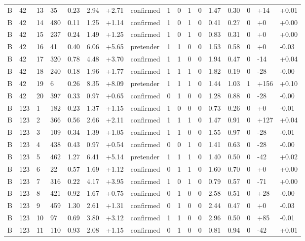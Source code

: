 \documentclass[11pt,a4paper]{article}
\begin{document}
{\begin{longtable}[]{@{}lllllllllllllllll@{}}
B & 42 & 13 & 35 & 0.23 & 2.94 & +2.71 & confirmed & 1 & 0 & 1 & 0 & 1.47 & 0.30 & 0 & +14 & +0.01 \\
B & 42 & 14 & 480 & 0.11 & 1.25 & +1.14 & confirmed & 1 & 0 & 1 & 0 & 0.41 & 0.27 & 0 & +0 & +0.00 \\
B & 42 & 15 & 237 & 0.24 & 1.49 & +1.25 & confirmed & 1 & 0 & 1 & 0 & 0.83 & 0.31 & 0 & +0 & +0.00 \\
B & 42 & 16 & 41 & 0.40 & 6.06 & +5.65 & pretender & 1 & 1 & 0 & 0 & 1.53 & 0.58 & 0 & +0 & -0.03 \\
B & 42 & 17 & 320 & 0.78 & 4.48 & +3.70 & confirmed & 1 & 1 & 0 & 0 & 1.94 & 0.47 & 0 & -14 & +0.04 \\
B & 42 & 18 & 240 & 0.18 & 1.96 & +1.77 & confirmed & 1 & 1 & 1 & 0 & 1.82 & 0.19 & 0 & -28 & -0.00 \\
B & 42 & 19 & 6 & 0.26 & 8.35 & +8.09 & pretender & 1 & 1 & 1 & 0 & 1.44 & 1.03 & 1 & +156 & +0.10 \\
B & 42 & 20 & 397 & 0.33 & 0.97 & +0.65 & confirmed & 0 & 1 & 0 & 0 & 1.28 & 0.88 & 0 & -28 & -0.00 \\
B & 123 & 1 & 182 & 0.23 & 1.37 & +1.15 & confirmed & 1 & 0 & 0 & 0 & 0.73 & 0.26 & 0 & +0 & -0.01 \\
B & 123 & 2 & 366 & 0.56 & 2.66 & +2.11 & confirmed & 1 & 1 & 1 & 0 & 1.47 & 0.91 & 0 & +127 & +0.04 \\
B & 123 & 3 & 109 & 0.34 & 1.39 & +1.05 & confirmed & 1 & 1 & 0 & 0 & 1.55 & 0.97 & 0 & -28 & -0.01 \\
B & 123 & 4 & 438 & 0.43 & 0.97 & +0.54 & confirmed & 0 & 0 & 1 & 0 & 1.41 & 0.63 & 0 & -28 & -0.00 \\
B & 123 & 5 & 462 & 1.27 & 6.41 & +5.14 & pretender & 1 & 1 & 1 & 0 & 1.40 & 0.50 & 0 & -42 & +0.02 \\
B & 123 & 6 & 22 & 0.57 & 1.69 & +1.12 & confirmed & 0 & 1 & 1 & 0 & 1.60 & 0.70 & 0 & +0 & +0.00 \\
B & 123 & 7 & 316 & 0.22 & 4.17 & +3.95 & confirmed & 1 & 0 & 1 & 0 & 0.79 & 0.57 & 0 & -71 & +0.00 \\
B & 123 & 8 & 421 & 0.92 & 1.67 & +0.75 & confirmed & 0 & 1 & 0 & 0 & 2.58 & 0.51 & 0 & +28 & -0.00 \\
B & 123 & 9 & 459 & 1.30 & 2.61 & +1.31 & confirmed & 0 & 1 & 0 & 0 & 2.44 & 0.47 & 0 & +0 & -0.03 \\
B & 123 & 10 & 97 & 0.69 & 3.80 & +3.12 & confirmed & 1 & 1 & 0 & 0 & 2.96 & 0.50 & 0 & +85 & -0.01 \\
B & 123 & 11 & 110 & 0.93 & 2.08 & +1.15 & confirmed & 0 & 1 & 0 & 0 & 0.81 & 0.94 & 0 & -42 & +0.01 \\

\end{longtable}}
\end{document}
